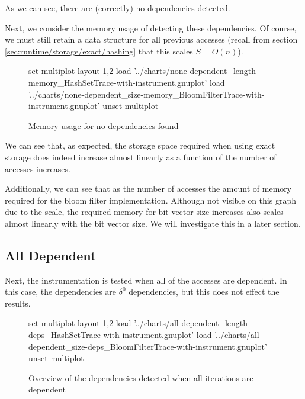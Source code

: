 	As we can see, there are (correctly) no dependencies detected.
	
	Next, we consider the memory usage of detecting these dependencies. Of course, we must still retain a data structure for all previous accesses (recall from section \ref{sec:runtime/storage/exact/hashing} that this scales $S=O(n)$).
	
	\begin{figure}[H]
		\centering
		\begin{gnuplot}[terminal=pdf]
			set multiplot layout 1,2
				load '../charts/none-dependent_length-memory_HashSetTrace-with-instrument.gnuplot'
				load '../charts/none-dependent_size-memory_BloomFilterTrace-with-instrument.gnuplot'
			unset multiplot
		\end{gnuplot}
		\caption{Memory usage for no dependencies found}
		\label{chart:none-dependent-memory-comparison}
	\end{figure}
	
	We can see that, as expected, the storage space required when using exact storage does indeed increase almost linearly as a function of the number of accesses increases.
	
	Additionally, we can see that as the number of accesses the amount of memory required for the bloom filter implementation. Although not visible on this graph due to the scale, the required memory for bit vector size increases also scales almost linearly with the bit vector size. We will investigate this in a later section.
	
	\subsection{All Dependent} \label{sec:result/basic/all-dep}
	Next, the instrumentation is tested when all of the accesses are dependent. In this case, the dependencies are $\delta^{0}$ dependencies, but this does not effect the results.
	
	\begin{figure}
		\centering
		\begin{gnuplot}[terminal=pdf]
			set multiplot layout 1,2
				load '../charts/all-dependent_length-deps_HashSetTrace-with-instrument.gnuplot'
				load '../charts/all-dependent_size-deps_BloomFilterTrace-with-instrument.gnuplot'		
			unset multiplot
		\end{gnuplot}
		\label{chart:all-dependent-deps-comparison}
		\caption{Overview of the dependencies detected when all iterations are dependent}
	\end{figure}
	
